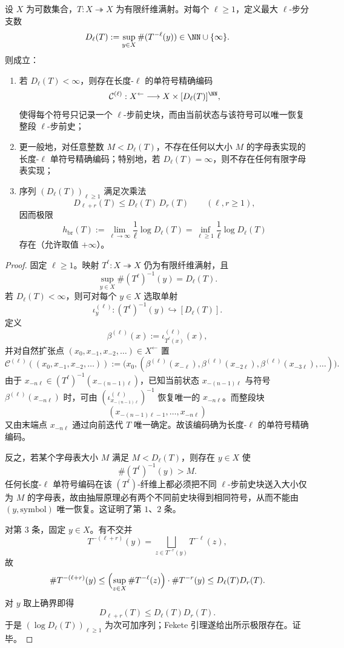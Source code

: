 \begin{theorem}\label{thm:conclusion-natural-extension-lstep-minimal-alphabet-submultiplicative}
设 \(X\) 为可数集合，\(T:X\twoheadrightarrow X\) 为有限纤维满射。对每个 \(\ell\ge 1\)，定义最大 \(\ell\)-步分支数
\[
D_\ell(T):=\sup_{y\in X}\#(T^{-\ell}(y))\in \NN\cup\{\infty\}.
\]
则成立：
\begin{enumerate}
  \item 若 \(D_\ell(T)<\infty\)，则存在长度-\(\ell\) 的单符号精确编码
  \[
  \mathcal C^{(\ell)}:X^{\leftarrow}\longrightarrow X\times [D_\ell(T)]^{\NN},
  \]
  使得每个符号只记录一个 \(\ell\)-步前史块，而由当前状态与该符号可以唯一恢复整段 \(\ell\)-步前史；
  \item 更一般地，对任意整数 \(M<D_\ell(T)\)，不存在任何以大小 \(M\) 的字母表实现的长度-\(\ell\) 单符号精确编码；特别地，若 \(D_\ell(T)=\infty\)，则不存在任何有限字母表实现；
  \item 序列 \((D_\ell(T))_{\ell\ge 1}\) 满足次乘法
  \[
  D_{\ell+r}(T)\le D_\ell(T)\,D_r(T)
  \qquad(\ell,r\ge 1),
  \]
  因而极限
  \[
  h_{\mathrm{br}}(T):=\lim_{\ell\to\infty}\frac{1}{\ell}\log D_\ell(T)
  =
  \inf_{\ell\ge 1}\frac{1}{\ell}\log D_\ell(T)
  \]
  存在（允许取值 \(+\infty\)）。
\end{enumerate}
\end{theorem}
\begin{proof}
固定 \(\ell\ge 1\)。映射 \(T^\ell:X\twoheadrightarrow X\) 仍为有限纤维满射，且
\[
\sup_{y\in X}\#(T^\ell)^{-1}(y)=D_\ell(T).
\]
若 \(D_\ell(T)<\infty\)，则可对每个 \(y\in X\) 选取单射
\[
\iota^{(\ell)}_y:(T^\ell)^{-1}(y)\hookrightarrow [D_\ell(T)].
\]
定义
\[
\beta^{(\ell)}(x):=\iota^{(\ell)}_{T^\ell(x)}(x),
\]
并对自然扩张点 \((x_0,x_{-1},x_{-2},\dots)\in X^{\leftarrow}\) 置
\[
\mathcal C^{(\ell)}((x_0,x_{-1},x_{-2},\dots))
:=
\bigl(x_0,(\beta^{(\ell)}(x_{-\ell}),\beta^{(\ell)}(x_{-2\ell}),\beta^{(\ell)}(x_{-3\ell}),\dots)\bigr).
\]
由于 \(x_{-n\ell}\in (T^\ell)^{-1}(x_{-(n-1)\ell})\)，已知当前状态 \(x_{-(n-1)\ell}\) 与符号 \(\beta^{(\ell)}(x_{-n\ell})\) 时，可由 \((\iota^{(\ell)}_{x_{-(n-1)\ell}})^{-1}\) 恢复唯一的 \(x_{-n\ell}\)。而整段块
\[
(x_{-(n-1)\ell-1},\dots,x_{-n\ell})
\]
又由末端点 \(x_{-n\ell}\) 通过向前迭代 \(T\) 唯一确定。故该编码确为长度-\(\ell\) 的单符号精确编码。

反之，若某个字母表大小 \(M\) 满足 \(M<D_\ell(T)\)，则存在 \(y\in X\) 使
\[
\#(T^\ell)^{-1}(y)>M.
\]
任何长度-\(\ell\) 单符号编码在该 \((T^\ell)\)-纤维上都必须把不同 \(\ell\)-步前史块送入大小仅为 \(M\) 的字母表，故由抽屉原理必有两个不同前史块得到相同符号，从而不能由 \((y,\text{symbol})\) 唯一恢复。这证明了第 \(1\)、\(2\) 条。

对第 \(3\) 条，固定 \(y\in X\)。有不交并
\[
T^{-(\ell+r)}(y)
=
\bigsqcup_{z\in T^{-r}(y)}T^{-\ell}(z),
\]
故
\[
\#T^{-(\ell+r)}(y)
\le
\Bigl(\sup_{z\in X}\#T^{-\ell}(z)\Bigr)\cdot \#T^{-r}(y)
\le
D_\ell(T)D_r(T).
\]
对 \(y\) 取上确界即得
\[
D_{\ell+r}(T)\le D_\ell(T)D_r(T).
\]
于是 \((\log D_\ell(T))_{\ell\ge 1}\) 为次可加序列；Fekete 引理遂给出所示极限存在。证毕。
\end{proof}

